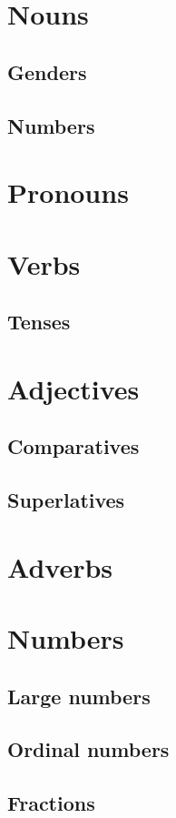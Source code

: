\section{Nouns}
\subsection{Genders}
\subsection{Numbers}

\section{Pronouns}

\section{Verbs}
\subsection{Tenses}

\section{Adjectives}
\subsection{Comparatives}
\subsection{Superlatives}

\section{Adverbs}

\section{Numbers}
\subsection{Large numbers}
\subsection{Ordinal numbers}
\subsection{Fractions}


